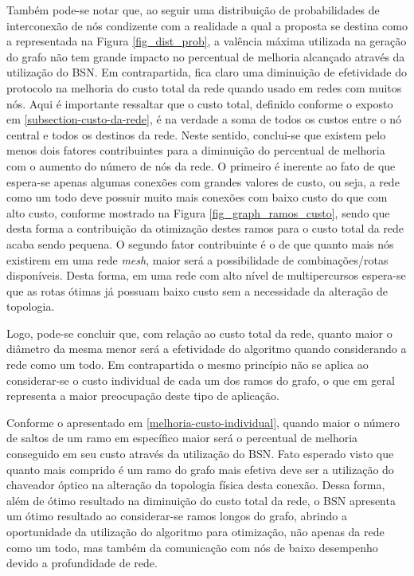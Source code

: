 Também pode-se notar que, ao seguir uma distribuição de probabilidades de interconexão de nós condizente com a realidade a qual a proposta se destina como a representada na Figura \ref{fig_dist_prob}, a valência máxima utilizada na geração do grafo não tem grande impacto no percentual de melhoria alcançado através da utilização do BSN. Em contrapartida, fica claro uma diminuição de efetividade do protocolo na melhoria do custo total da rede quando usado em redes com muitos nós. Aqui é importante ressaltar que o custo total, definido conforme o exposto em \ref{subsection-custo-da-rede}, é na verdade a soma de todos os custos entre o nó central e todos os destinos da rede. Neste sentido, conclui-se que existem pelo menos dois fatores contribuintes para a diminuição do percentual de melhoria com o aumento do número de nós da rede. O primeiro é inerente ao fato de que espera-se apenas algumas conexões com grandes valores de custo, ou seja, a rede como um todo deve possuir muito mais conexões com baixo custo do que com alto custo, conforme mostrado na Figura \ref{fig_graph_ramos_custo}, sendo que desta forma a contribuição da otimização destes ramos para o custo total da rede acaba sendo pequena. O segundo fator contribuinte é o de que quanto mais nós existirem em uma rede \emph{mesh}, maior será a possibilidade de combinações/rotas disponíveis. Desta forma, em uma rede com alto nível de multipercursos espera-se que as rotas ótimas já possuam baixo custo sem a necessidade da alteração de topologia.

Logo, pode-se concluir que, com relação ao custo total da rede, quanto maior o diâmetro da mesma menor será a efetividade do algoritmo quando considerando a rede como um todo. Em contrapartida o mesmo princípio não se aplica ao considerar-se o custo individual de cada um dos ramos do grafo, o que em geral representa a maior preocupação deste tipo de aplicação.

Conforme o apresentado em \ref{melhoria-custo-individual}, quando maior o número de saltos de um ramo em específico maior será o percentual de melhoria conseguido em seu custo através da utilização do BSN. Fato esperado visto que quanto mais comprido é um ramo do grafo mais efetiva deve ser a utilização do chaveador óptico na alteração da topologia física desta conexão. Dessa forma, além de ótimo resultado na diminuição do custo total da rede, o BSN apresenta um ótimo resultado ao considerar-se ramos longos do grafo, abrindo a oportunidade da utilização do algoritmo para otimização, não apenas da rede como um todo, mas também da comunicação com nós de baixo desempenho devido a profundidade de rede.

